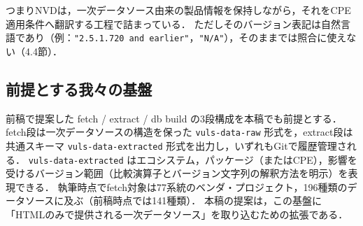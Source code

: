 つまりNVDは，一次データソース由来の製品情報を保持しながら，それをCPE適用条件へ翻訳する工程で詰まっている．
ただしそのバージョン表記は自然言語であり（例：\texttt{"2.5.1.720 and earlier"}，\texttt{"N/A"}），そのままでは照合に使えない（4.4節）．

\subsection{前提とする我々の基盤}

前稿\cite{nakaoka2025}で提案した fetch / extract / db build の3段構成を本稿でも前提とする．
fetch段は一次データソースの構造を保った \texttt{vuls-data-raw} 形式を，extract段は共通スキーマ \texttt{vuls-data-extracted} 形式を出力し，いずれもGitで履歴管理される．
\texttt{vuls-data-extracted} はエコシステム，パッケージ（またはCPE），影響を受けるバージョン範囲（比較演算子とバージョン文字列の解釈方法を明示）を表現できる．
執筆時点でfetch対象は77系統のベンダ・プロジェクト，196種類のデータソースに及ぶ（前稿時点では141種類）．
本稿の提案は，この基盤に「HTMLのみで提供される一次データソース」を取り込むための拡張である．
